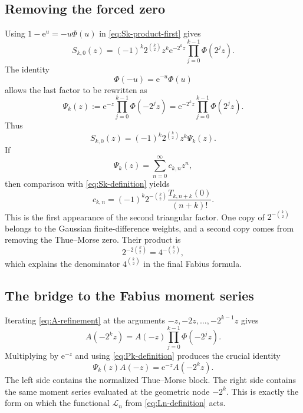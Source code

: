 \documentclass[11pt]{article}
\theoremstyle{definition}
\newcommand{\e}{\mathrm{e}}
\begin{document}
\subsection{Removing the forced zero}

Using $1-\e^u=-u\Phi(u)$ in \cref{eq:Sk-product-first} gives
\begin{equation}
  S_{k,0}(z)
  =(-1)^k2^{\binom{k}{2}}z^k
    \e^{-2^kz}\prod_{j=0}^{k-1}\Phi(2^jz).
  \label{eq:Sk-factor-positive}
\end{equation}
The identity
\begin{equation}
  \Phi(-u)=\e^{-u}\Phi(u)
  \label{eq:Phi-reflection}
\end{equation}
allows the last factor to be rewritten as
\begin{equation}
  \Psi_k(z):=\e^{-z}\prod_{j=0}^{k-1}\Phi(-2^jz)
  =\e^{-2^kz}\prod_{j=0}^{k-1}\Phi(2^jz).
  \label{eq:Pk-definition}
\end{equation}
Thus
\begin{equation}
  S_{k,0}(z)=(-1)^k2^{\binom{k}{2}}z^k\Psi_k(z).
  \label{eq:Sk-Pk}
\end{equation}
If
\begin{equation}
  \Psi_k(z)=\sum_{n=0}^{\infty}c_{k,n}z^n,
  \label{eq:ckn-definition}
\end{equation}
then comparison with \cref{eq:Sk-definition} yields
\begin{equation}
  c_{k,n}
  =(-1)^k2^{-\binom{k}{2}}
    \frac{T_{k,n+k}(0)}{(n+k)!}.
  \label{eq:ckn-T}
\end{equation}
This is the first appearance of the second triangular factor.  One copy of $2^{-\binom{k}{2}}$ belongs to the Gaussian finite-difference weights, and a second copy comes from removing the Thue--Morse zero.  Their product is
\begin{equation}
  2^{-2\binom{k}{2}}=4^{-\binom{k}{2}},
  \label{eq:four-triangle}
\end{equation}
which explains the denominator $4^{\binom{k}{2}}$ in the final Fabius formula.

\subsection{The bridge to the Fabius moment series}

Iterating \cref{eq:A-refinement} at the arguments $-z,-2z,\ldots,-2^{k-1}z$ gives
\begin{equation}
  A(-2^kz)=A(-z)\prod_{j=0}^{k-1}\Phi(-2^jz).
  \label{eq:A-negative-iterate}
\end{equation}
Multiplying by $\e^{-z}$ and using \cref{eq:Pk-definition} produces the crucial identity
\begin{equation}
  \Psi_k(z)A(-z)=\e^{-z}A(-2^kz).
  \label{eq:Pk-A-bridge}
\end{equation}
The left side contains the normalized Thue--Morse block.  The right side contains the same moment series evaluated at the geometric node $-2^k$.  This is exactly the form on which the functional $\mathcal L_n$ from \cref{eq:Ln-definition} acts.
\end{document}
